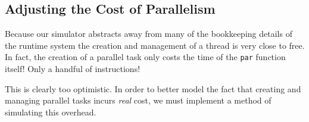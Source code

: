 \subsection{Adjusting the Cost of Parallelism}

Because our simulator abstracts away from many of the bookkeeping details
of the runtime system the creation and management of a thread is very close
to free. In fact, the creation of a parallel task only costs the time
of the \verb|par| function itself! Only a handful of instructions!

This is clearly too optimistic. In order to better model the fact that
creating and managing parallel tasks incurs \emph{real} cost, we must
implement a method of simulating this overhead.

